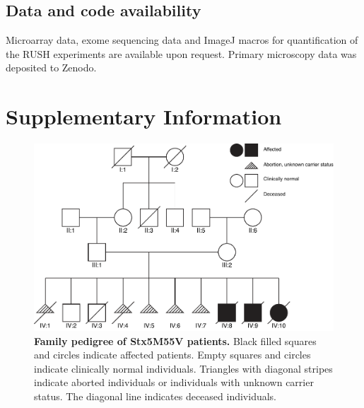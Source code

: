\subsection{Data and code availability}

Microarray data, exome sequencing data and ImageJ macros for quantification of the RUSH experiments are available upon request. Primary microscopy data was deposited to Zenodo.

\clearpage

\section{Supplementary Information}

\begin{figure}
    \includegraphics[keepaspectratio=true,width=\textwidth,height=\textheight]{chapters/chapter6/chapter6_SupplementaryFigure1.pdf}
    \caption{\textbf{Family pedigree of Stx5M55V patients.} Black filled squares and circles indicate affected patients. Empty squares and circles indicate clinically normal individuals. Triangles with diagonal stripes indicate aborted individuals or individuals with unknown carrier status. The diagonal line indicates deceased individuals.}
    \label{fig:ch6supfig1}
\end{figure}

\clearpage

